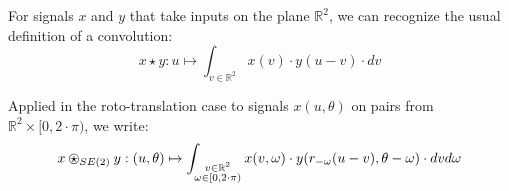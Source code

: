                 For signals $x$ and $y$ that take inputs on the plane $\mathbb{R}^2$, we can recognize the usual definition of a convolution:
                \begin{equation}
                    \label{eq::translation_convolution}
                    x \star y: u \mapsto \int_{v \in \mathbb{R}^2} x(v)\cdot y(u - v) \cdot dv
                \end{equation}

                Applied in the roto-translation case to signals $x(u, \theta)$ on pairs from $\mathbb{R}^2 \times [0, 2\cdot\pi)$, we write:
                \begin{equation}
                    \label{eq::roto-translation_convolution}
                    x \ostar_{SE(2)} y: (u, \theta) \mapsto \int_{\substack{v \in \mathbb{R}^2\\\omega \in [0, 2\cdot\pi)}} x(v, \omega)\cdot y(r_{-\omega}(u - v), \theta - \omega) \cdot dv d\omega
                \end{equation}

